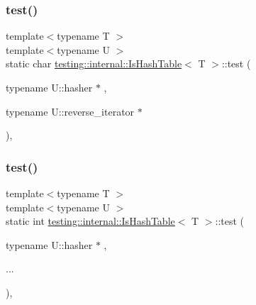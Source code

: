 \subsubsection{\texorpdfstring{test()}{test()}\hspace{0.1cm}{\footnotesize\ttfamily [1/3]}}
{\footnotesize\ttfamily template$<$typename T $>$ \\
template$<$typename U $>$ \\
static char \hyperlink{structtesting_1_1internal_1_1IsHashTable}{testing\+::internal\+::\+Is\+Hash\+Table}$<$ T $>$\+::test (\begin{DoxyParamCaption}\item[{typename U\+::hasher $\ast$}]{,  }\item[{typename U\+::reverse\+\_\+iterator $\ast$}]{ }\end{DoxyParamCaption})\hspace{0.3cm}{\ttfamily [static]}, {\ttfamily [private]}}

\mbox{\label{structtesting_1_1internal_1_1IsHashTable_a195b49a6ae5090b6266a5fa4ab771962}} 
\subsubsection{\texorpdfstring{test()}{test()}\hspace{0.1cm}{\footnotesize\ttfamily [2/3]}}
{\footnotesize\ttfamily template$<$typename T $>$ \\
template$<$typename U $>$ \\
static int \hyperlink{structtesting_1_1internal_1_1IsHashTable}{testing\+::internal\+::\+Is\+Hash\+Table}$<$ T $>$\+::test (\begin{DoxyParamCaption}\item[{typename U\+::hasher $\ast$}]{,  }\item[{}]{... }\end{DoxyParamCaption})\hspace{0.3cm}{\ttfamily [static]}, {\ttfamily [private]}}

\mbox{\label{structtesting_1_1internal_1_1IsHashTable_a40461295b959ff31e06241d4de072be0}} 
